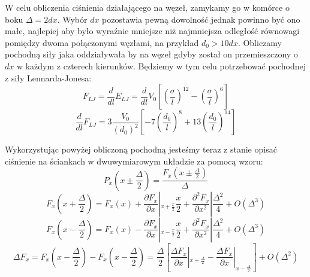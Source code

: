 \documentclass[12pt, letterpaper]{report}
\begin{document}
    W celu obliczenia ciśnienia działającego na węzeł, zamykamy go w komórce 
    o boku $\Delta = 2 dx$. Wybór $dx$ pozostawia pewną dowolność jednak powinno być ono małe, najlepiej aby było wyraźnie 
    mniejsze niż najmniejsza odległość równowagi pomiędzy dwoma połączonymi węzłami, na przykład $d_0 > 10 dx$. 
    Obliczamy pochodną siły jaka oddziaływała 
    by na węzeł gdyby został on przemieszczony o $dx$ w każdym z czterech kierunków. 
    Będziemy w tym celu potrzebować pochodnej z siły Lennarda-Jonesa:
    \begin{equation}
        F_{LJ} = 
        \frac{d}{dl} E_{LJ} = 
        \frac{d}{dl} V_0 \left[ \left( \frac{\sigma}{l} \right)^{12} - \left( \frac{\sigma}{l} \right)^{6} \right]
    \end{equation}
    \begin{equation}
        \frac{d}{dl} F_{LJ} = 3\frac{V_0}{(d_0)^2} \left[ -7 \left(\frac{d_0}{l}\right)^{8} + 13 \left(\frac{d_0}{l}\right)^{14} \right]
    \end{equation}
    
    Wykorzystując powyżej obliczoną pochodną jesteśmy teraz z stanie opisać ciśnienie 
    na ściankach w dwuwymiarowym układzie za pomocą wzoru:
    \begin{equation}
        P_x (x \pm \frac{\Delta}{2}) = \frac{F_x (x \pm \frac{\Delta}{2})}{\Delta}
    \end{equation}
    \begin{equation}
        F_x (x + \frac{\Delta}{2}) = F_x (x) + \frac{\partial F_x}{\partial x} 
        \left| _{x + \frac{x}{2}}  \frac{x}{2} + \frac{\partial^2 F_x}{\partial x^2 }  \right| \frac{\Delta^2}{4} + O(\Delta^3)
    \end{equation}
    \begin{equation}
        F_x (x - \frac{\Delta}{2}) = F_x (x) - \frac{\partial F_x}{\partial x} 
        \left| _{x - \frac{x}{2}}  \frac{x}{2} + \frac{\partial^2 F_x}{\partial x^2 }  \right| \frac{\Delta^2}{4} + O(\Delta^3)
    \end{equation} 
    \begin{equation}
        \Delta F_x = 
        F_x (x - \frac{\Delta}{2}) - F_x (x - \frac{\Delta}{2}) = 
        \frac{\Delta}{2} \left[ \frac{\Delta F_x}{\partial x} |_{x + \frac{\Delta}{2}}  -
          \frac{\Delta F_x}{\partial x}|_{x - \frac{\Delta}{2}} \right] + O(\Delta^2)
    \end{equation}
\end{document}
